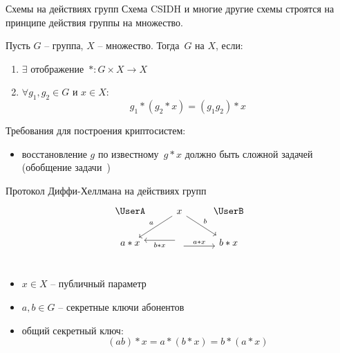 \documentclass{beamer}
\begin{document}
\begin{frame}{Схемы на действиях групп}
	Схема CSIDH и многие другие схемы строятся на принципе действия группы на множество.
	\vspace{0.5em}
	\begin{tcolorbox}[colframe=title-and-section-color!120, colback=title-and-section-color!5, title=Определение, center title]
		Пусть $G$ -- группа, $X$ -- множество. Тогда~$G$  на $X$, если:
		\begin{enumerate}
			\item $\exists$ отображение~$*: G \times X \rightarrow X$
			\item $\forall g_1, g_2 \in G$ и $x \in X$:
			\[g_1 * (g_2 * x) = (g_1 g_2) * x\]
		\end{enumerate}
	\end{tcolorbox}
	
	Требования для построения криптосистем:
	\begin{itemize}
		\item восстановление $g$ по известному~$g * x$ должно быть сложной задачей (обобщение задачи~)
	\end{itemize}
\end{frame}

\begin{frame}[fragile]{Протокол Диффи-Хеллмана на действиях групп}
	\[
	\begin{tikzcd}
		\text{\UserA} &\arrow{ld}[swap]{a} x  \arrow{rd}{b} & \text{\UserB} \\
		a * x &
		\arrow[yshift=-0.7ex]{r}{a * x}
		\arrow[yshift=0.7ex]{l}{b * x}
		& b * x\\
	\end{tikzcd}
	\]
	\begin{itemize}
		\item $x \in X$ -- публичный параметр
		\item $a,b \in G$ -- секретные ключи абонентов
		\item общий секретный ключ:
		\[(a b) * x = a * (b * x) = b * (a * x)\]
	\end{itemize}
\end{frame}
\end{document}
